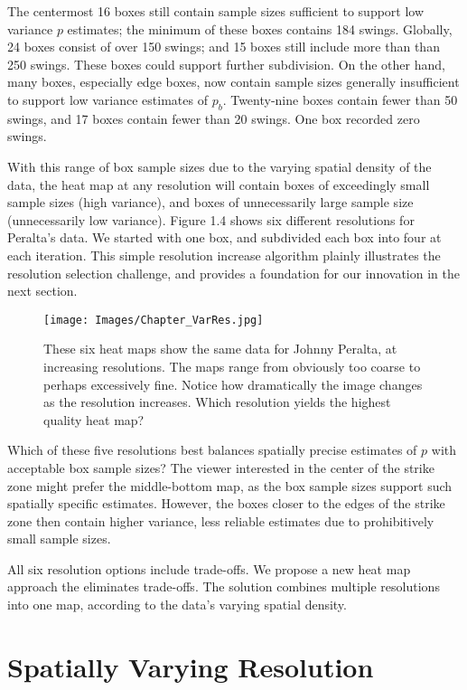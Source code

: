 The centermost 16 boxes still contain sample sizes sufficient to support low variance $p$ estimates; the minimum of these boxes contains 184 swings. Globally, 24 boxes consist of over 150 swings; and 15 boxes still include more than than 250 swings. These boxes could support further subdivision. On the other hand, many boxes, especially edge boxes, now contain sample sizes generally insufficient to support low variance estimates of $p_{b}$. Twenty-nine boxes contain fewer than 50 swings, and 17 boxes contain fewer than 20 swings. One box recorded zero swings.

With this range of box sample sizes due to the varying spatial density of the data, the heat map at any resolution will contain boxes of exceedingly small sample sizes (high variance), and boxes of unnecessarily large sample size (unnecessarily low variance). Figure 1.4 shows six different resolutions for Peralta's data. We started with one box, and subdivided each box into four at each iteration. This simple resolution increase algorithm plainly illustrates the resolution selection challenge, and provides a foundation for our innovation in the next section. 
        \begin{figure}[H]
      	\centering
      	\texttt{[image: Images/Chapter\_VarRes.jpg]} 
      	\caption{These six heat maps show the same data for Johnny Peralta, at increasing resolutions. The maps range from obviously too coarse to perhaps excessively fine. Notice how dramatically the image changes as the resolution increases. Which resolution yields the highest quality heat map?}
      	\end{figure} 
Which of these five resolutions best balances spatially precise estimates of $p$ with acceptable box sample sizes? The viewer interested in the center of the strike zone might prefer the middle-bottom map, as the box sample sizes support such spatially specific estimates. However, the boxes closer to the edges of the strike zone then contain higher variance, less reliable estimates due to prohibitively small sample sizes. 

All six resolution options include trade-offs. We propose a new heat map approach the eliminates trade-offs. The solution combines multiple resolutions into one map, according to the data's varying spatial density.

\section{Spatially Varying Resolution} %

